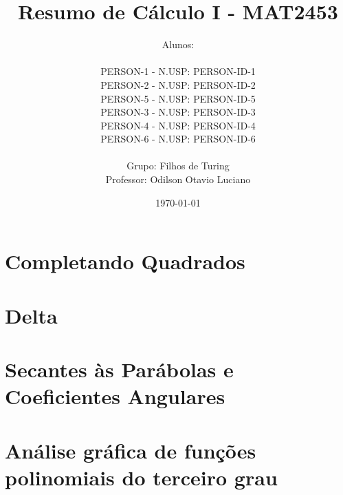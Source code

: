 \documentclass[12pt, a4paper]{article}
\title{
	Resumo de Cálculo I - MAT2453
}
\author{
	Alunos:
	\\  
	\\ {{PERSON-1}} - N.USP: {{PERSON-ID-1}}
	\\ {{PERSON-2}} - N.USP: {{PERSON-ID-2}}
	\\ {{PERSON-5}} - N.USP: {{PERSON-ID-5}}
	\\ {{PERSON-3}} - N.USP: {{PERSON-ID-3}}
	\\ {{PERSON-4}} - N.USP: {{PERSON-ID-4}}
	\\ {{PERSON-6}} - N.USP: {{PERSON-ID-6}}
	\\ \\
	Grupo: Filhos de Turing
	\\ Professor: Odilson Otavio Luciano
}
\date{\today}
\begin{document}
	\maketitle
	\thispagestyle{empty}
	\newpage

	\renewcommand*\contentsname{Sumário}
	\tableofcontents
	
	\newpage

	\section{Completando Quadrados}

	

	\section{Delta}

	

	\section{Secantes às Parábolas e Coeficientes Angulares}

	

	\section{Análise gráfica de funções polinomiais do terceiro grau}

	
\end{document}

